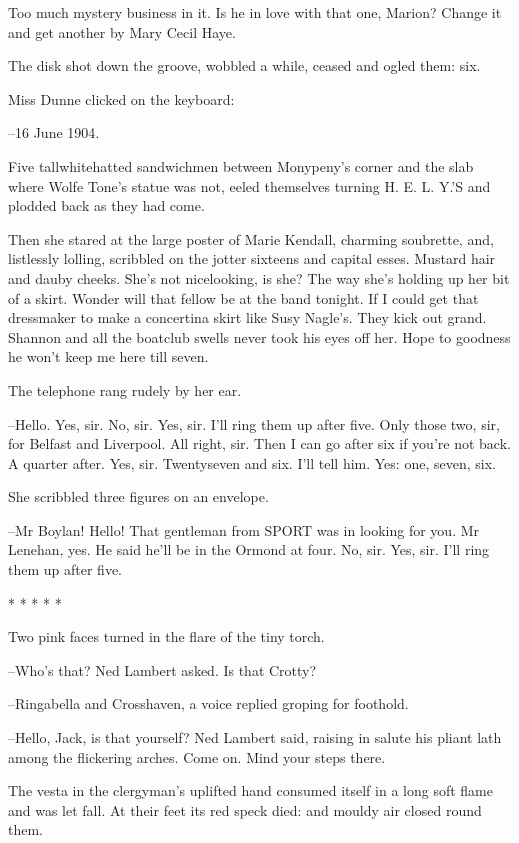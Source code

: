 Too much mystery business in it. Is he in love with that one, Marion?
Change it and get another by Mary Cecil Haye.

The disk shot down the groove, wobbled a while, ceased and ogled
them: six.

Miss Dunne clicked on the keyboard:

--16 June 1904.

Five tallwhitehatted sandwichmen between Monypeny's corner and
the slab where Wolfe Tone's statue was not, eeled themselves turning
H. E. L. Y.'S and plodded back as they had come.


Then she stared at the large poster of Marie Kendall,
charming soubrette,
and, listlessly lolling, scribbled on the jotter sixteens and capital
esses. Mustard hair and dauby cheeks. She's not nicelooking, is she? The
way she's holding up her bit of a skirt. Wonder will that fellow be at the
band tonight. If I could get that dressmaker to make a concertina skirt
like Susy Nagle's. They kick out grand. Shannon and all the boatclub
swells never took his eyes off her. Hope to goodness he won't keep me here
till seven.

The telephone rang rudely by her ear.

--Hello.
Yes, sir.
No, sir.
Yes, sir.
I'll ring them up after five.
Only those two, sir, for Belfast and Liverpool.
All right, sir.
Then I can go after six if you're not back.
A quarter after.
Yes, sir.
Twentyseven and six.
I'll tell him.
Yes: one, seven, six.

She scribbled three figures on an envelope.

--Mr Boylan! Hello! That gentleman from SPORT was in looking for you.
Mr Lenehan, yes. He said he'll be in the Ormond at four. No, sir. Yes,
sir. I'll ring them up after five.


    * * * * *


Two pink faces turned in the flare of the tiny torch.

--Who's that? Ned Lambert asked. Is that Crotty?

--Ringabella and Crosshaven,
a voice replied groping for foothold.

--Hello, Jack, is that yourself? Ned Lambert said, raising in salute his
pliant lath among the flickering arches. Come on. Mind your steps there.

The vesta in the clergyman's uplifted hand consumed itself in a long soft
flame and was let fall. At their feet its red speck died: and mouldy air
closed round them.

